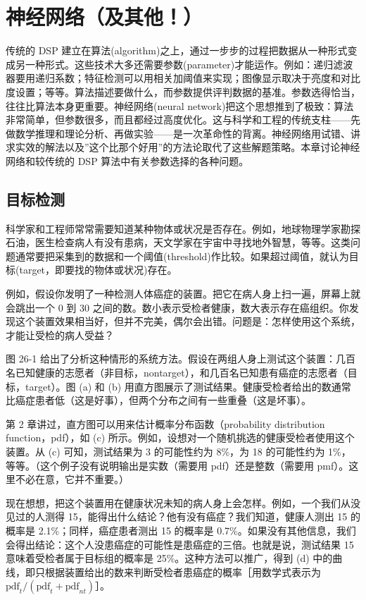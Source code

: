 
\chapter{神经网络（及其他！）}\label{ch-26}

传统的 DSP
建立在算法(algorithm)之上，通过一步步的过程把数据从一种形式变成另一种形式。这些技术大多还需要参数(parameter)才能运作。例如：递归滤波器要用递归系数；特征检测可以用相关加阈值来实现；图像显示取决于亮度和对比度设置；等等。算法描述要做什么，而参数提供评判数据的基准。参数选得恰当，往往比算法本身更重要。神经网络(neural
network)把这个思想推到了极致：算法非常简单，但参数很多，而且都经过高度优化。这与科学和工程的传统支柱------先做数学推理和理论分析、再做实验------是一次革命性的背离。神经网络用试错、讲求实效的解法以及''这个比那个好用''的方法论取代了这些解题策略。本章讨论神经网络和较传统的
DSP 算法中有关参数选择的各种问题。

\section{目标检测}

科学家和工程师常常需要知道某种物体或状况是否存在。例如，地球物理学家勘探石油，医生检查病人有没有患病，天文学家在宇宙中寻找地外智慧，等等。这类问题通常要把采集到的数据和一个阈值(threshold)作比较。如果超过阈值，就认为目标(target，即要找的物体或状况)存在。

例如，假设你发明了一种检测人体癌症的装置。把它在病人身上扫一遍，屏幕上就会跳出一个
0 到 30
之间的数。数小表示受检者健康，数大表示存在癌组织。你发现这个装置效果相当好，但并不完美，偶尔会出错。问题是：怎样使用这个系统，才能让受检的病人受益？

图 26-1
给出了分析这种情形的系统方法。假设在两组人身上测试这个装置：几百名已知健康的志愿者（非目标，nontarget），和几百名已知患有癌症的志愿者（目标，target）。图
(a) 和 (b)
用直方图展示了测试结果。健康受检者给出的数通常比癌症患者低（这是好事），但两个分布之间有一些重叠（这是坏事）。

第 2 章讲过，直方图可以用来估计概率分布函数（probability distribution
function，pdf），如 (c)
所示。例如，设想对一个随机挑选的健康受检者使用这个装置。从 (c)
可知，测试结果为 3 的可能性约为 8\%，为 18 的可能性约为
1\%，等等。（这个例子没有说明输出是实数（需要用 pdf）还是整数（需要用
pmf）。这里不必在意，它并不重要。）

现在想想，把这个装置用在健康状况未知的病人身上会怎样。例如，一个我们从没见过的人测得
15，能得出什么结论？他有没有癌症？我们知道，健康人测出 15 的概率是
2.1\%；同样，癌症患者测出 15 的概率是
0.7\%。如果没有其他信息，我们会得出结论：这个人没患癌症的可能性是患癌症的三倍。也就是说，测试结果
15 意味着受检者属于目标组的概率是 25\%。这种方法可以推广，得到 (d)
中的曲线，即只根据装置给出的数来判断受检者患癌症的概率［用数学式表示为
\(\text{pdf}_t / (\text{pdf}_t + \text{pdf}_{nt})\)］。

